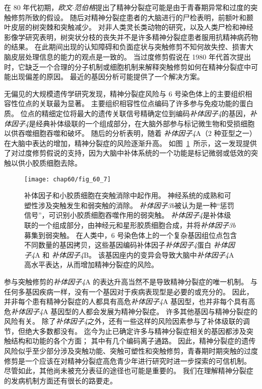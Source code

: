 在 80 年代初期，\textit{欧文$\cdot$范伯格}提出了精神分裂症可能是由于青春期异常和过度的突触修剪所致的假设。
随后对精神分裂症患者的大脑进行的尸检表明，前额叶和颞叶皮层的树突棘和突触减少。
对非人类灵长类动物的研究，以及人类尸检和神经影像学研究表明，树突状分枝的丧失并不是许多精神分裂症患者服用抗精神病药物的结果。
在此期间出现的认知障碍和负面症状与突触修剪不知何故失控、损害大脑皮层处理信息的能力的观点是一致的。
当过度修剪假说在 1980 年代首次提出时，它缺乏一个合理的分子机制或细胞机制来解释突触修剪如何在精神分裂症中可能出现偏差的原因。
最近的基因分析可能提供了一个解决方案。


无偏见的大规模遗传学研究发现，精神分裂症风险与 6 号染色体上的主要组织相容性位点的关联最为显著。
主要组织相容性位点编码了许多参与免疫功能的蛋白质。
位点的精细定位将最大的遗传关联信号精确定位到编码\textit{补体因子4}的基因，\textit{补体因子4}是经典补体级联的一个组成部分，在大脑外部参与标记微生物和受损细胞以供吞噬细胞吞噬和破坏。
随后的分析表明，随着 \textit{补体因子4}A（2 种亚型之一）在大脑中表达的增加，精神分裂症的风险逐渐升高。
如图~\ref{fig:60_7}~所示，这一发现提供了对过度修剪假说的支持，因为大脑中补体系统的一个功能是标记微弱或低效的突触以供小胶质细胞去除。


\begin{figure}[htbp]
	\centering
	\texttt{[image: chap60/fig\_60\_7]}
	\caption{补体因子和小胶质细胞在突触消除中起作用。
		神经系统的成熟和可塑性涉及突触发生和弱突触的消除。
		\textit{补体因子3b}被认为是一种“惩罚信号”，可识别小胶质细胞吞噬作用的弱突触。
		\textit{补体因子4}是补体级联的一个组成部分，由神经元和星形胶质细胞合成，并将\textit{补体因子3b}募集到弱突触。
		在人类中，6 号染色体上的一个复杂基因组位点包含不同数量的基因拷贝，这些基因编码补体因子\textit{补体因子4}蛋白 \textit{补体因子4}A 和 \textit{补体因子4}B。
		该基因座内的变异会导致大脑中\textit{补体因子4}A 高水平表达，从而增加精神分裂症的风险。}
	\label{fig:60_7}
\end{figure}


参与突触修剪的\textit{补体因子4}A 的表达升高当然不是导致精神分裂症的唯一机制。
与任何多基因疾病一样，没有一个基因对于疾病表现型是必要的或充分的。
因此，并非每个患有精神分裂症的人都具有高危\textit{补体因子4}A 基因型，也并非每个具有高危\textit{补体因子4}A 基因型的人都会发展为精神分裂症。
许多其他基因与精神分裂症的风险有关。
除了\textit{补体因子4}之外，还有一些这样的风险因素参与了补体级联的调节，但绝大多数都没有。
迄今为止已确定许多与精神分裂症相关的基因都涉及突触结构和功能的各个方面；
其中有几个编码离子通路。
因此，精神分裂症的遗传风险似乎至少部分涉及突触功能、突触可塑性和突触修剪，青春期时期突触的过度修剪是一个应该在对精神分裂症高危青少年进行研究时进一步探索的可信机制。
尽管如此，其他尚未被充分表征的途径也可能是重要的。
我们在理解精神分裂症的发病机制方面还有很长的路要走。



